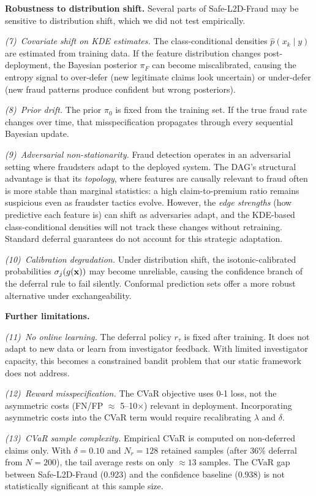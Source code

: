 \textbf{Robustness to distribution shift.}
Several parts of Safe-L2D-Fraud may be sensitive to distribution shift, which we did not test empirically.

\textit{(7)~Covariate shift on KDE estimates.} The class-conditional densities $\hat{p}(x_k \mid y)$ are estimated from training data. If the feature distribution changes post-deployment, the Bayesian posterior $\pi_F$ can become miscalibrated, causing the entropy signal to over-defer (new legitimate claims look uncertain) or under-defer (new fraud patterns produce confident but wrong posteriors).

\textit{(8)~Prior drift.} The prior $\pi_0$ is fixed from the training set. If the true fraud rate changes over time, that misspecification propagates through every sequential Bayesian update.

\textit{(9)~Adversarial non-stationarity.} Fraud detection operates in an adversarial setting where fraudsters adapt to the deployed system. The DAG's structural advantage is that its \textit{topology}, where features are causally relevant to fraud often is more stable than marginal statistics: a high claim-to-premium ratio remains suspicious even as fraudster tactics evolve. However, the \textit{edge strengths} (how predictive each feature is) can shift as adversaries adapt, and the KDE-based class-conditional densities will not track these changes without retraining. Standard deferral guarantees do not account for this strategic adaptation.

\textit{(10)~Calibration degradation.} Under distribution shift, the isotonic-calibrated probabilities $\sigma_j(g(\mathbf{x}))$ may become unreliable, causing the confidence branch of the deferral rule to fail silently. Conformal prediction sets offer a more robust alternative under exchangeability.

\textbf{Further limitations.}

\textit{(11)~No online learning.} The deferral policy $r_\tau$ is fixed after training. It does not adapt to new data or learn from investigator feedback. With limited investigator capacity, this becomes a constrained bandit problem that our static framework does not address.

\textit{(12)~Reward misspecification.} The CVaR objective uses 0-1 loss, not the asymmetric costs (FN/FP $\approx$ 5--10$\times$) relevant in deployment. Incorporating asymmetric costs into the CVaR term would require recalibrating $\lambda$ and $\delta$.

\textit{(13)~CVaR sample complexity.} Empirical CVaR is computed on non-deferred claims only. With $\delta{=}0.10$ and $N_r{=}128$ retained samples (after 36\% deferral from $N{=}200$), the tail average rests on only ${\approx}13$ samples. The CVaR gap between Safe-L2D-Fraud (0.923) and the confidence baseline (0.938) is not statistically significant at this sample size.

